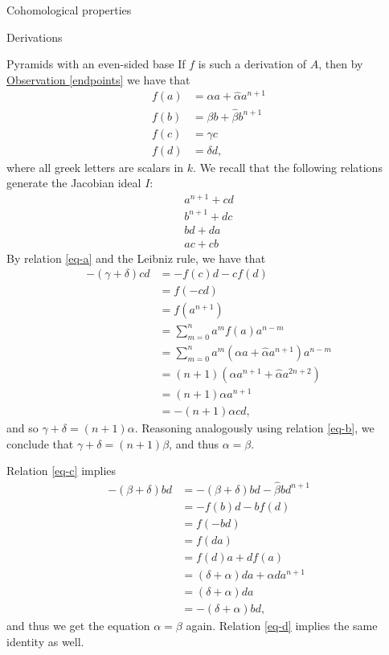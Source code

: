 \begin{chapter}{Cohomological properties}
\begin{section}{Derivations}
\begin{subsection}{Pyramids with an even-sided base}
If $f$ is such a derivation of $A$, then by \hyperref[endpoints]{Observation \ref*{endpoints}} we have that
\begin{equation}
\begin{aligned}
\label{pyramid-equations}
f(a) &= \alpha a + \hat\alpha a^{n+1}\\
f(b) &= \beta b + \hat\beta b^{n+1}\\
f(c) &= \gamma c \\
f(d) &= \delta d,
\end{aligned}
\end{equation}
where all greek letters are scalars in $k$. We recall that the following relations generate the Jacobian ideal $I$:
\begin{align}
a^{n+1}+cd \label{eq-a}\\
b^{n+1}+dc \label{eq-b}\\
bd+da \label{eq-c}\\
ac+cb \label{eq-d}
\end{align}
By relation \eqref{eq-a} and the Leibniz rule, we have that
\begin{align*}-(\gamma+\delta)cd&= -f(c)d - cf(d)\\
&= f(-cd)\\
&=f(a^{n+1})\\
&=\sum_{m=0}^{n} a^mf(a)a^{n-m}\\
&=\sum_{m=0}^{n} a^m(\alpha a + \hat\alpha a^{n+1}) a^{n-m}\\
&=(n+1)(\alpha a^{n+1} + \hat\alpha a^{2n+2})\\
&=(n+1)\alpha a^{n+1}\\
&=-(n+1)\alpha cd,
\end{align*}
and so $\gamma+\delta = (n+1)\alpha$. Reasoning analogously using relation \eqref{eq-b}, we conclude that $\gamma+\delta = (n+1)\beta$, and thus $\alpha=\beta$.

Relation \eqref{eq-c} implies
\begin{align*}-(\beta+\delta)bd &=-(\beta+\delta)bd - \hat\beta bd^{n+1}\\
&=-f(b)d - bf(d)\\
&=f(-bd)\\
&=f(da)\\
&=f(d)a+df(a)\\
&=(\delta+\alpha)da + \hat\alpha da^{n+1}\\
&=(\delta+\alpha)da\\
&=-(\delta+\alpha)bd,
\end{align*}
and thus we get the equation $\alpha=\beta$ again. Relation \eqref{eq-d} implies the same identity as well.


\end{subsection}
\end{section}
\end{chapter}
